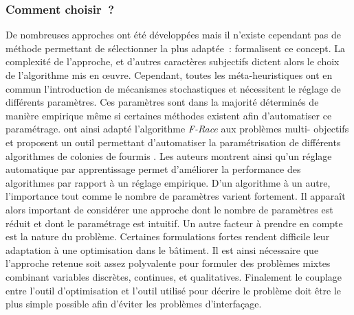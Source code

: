 \subsubsection{Comment choisir~?} %
\label{ssub:comment_choisir}
De nombreuses approches ont été développées mais il n’existe cependant pas de
méthode permettant de sélectionner la plus adaptée~: \textcite{Wolpert199767}
formalisent ce concept. La complexité de l’approche, et d’autres caractères
subjectifs dictent alors le choix de l’algorithme mis en œuvre. Cependant, toutes
les méta-heuristiques ont en commun l’introduction de mécanismes stochastiques
et nécessitent le réglage de différents paramètres. Ces paramètres sont dans la
majorité déterminés de manière empirique même si certaines méthodes
existent afin d’automatiser ce paramétrage. \textcite{Lopez-Ibanez2012861} ont ainsi
adapté l’algorithme \textit{F-Race} \parencite{Birattari2010311} aux problèmes multi-
objectifs et proposent un outil permettant d’automatiser la paramétrisation de
différents algorithmes de colonies de fourmis \parencite{Lopez-Ibanez2012861}.
Les auteurs montrent ainsi qu’un réglage automatique par apprentissage permet
d’améliorer la performance des algorithmes par rapport à un réglage empirique.
D’un algorithme à un autre, l’importance tout comme le nombre de paramètres
varient fortement. Il apparaît alors important de considérer une approche dont le
nombre de paramètres est réduit et dont le paramétrage est intuitif. Un autre
facteur à prendre en compte est la nature du problème. Certaines formulations
fortes rendent difficile leur adaptation à une optimisation dans le bâtiment. Il
est ainsi nécessaire que l’approche retenue soit assez polyvalente pour formuler des
problèmes mixtes combinant variables discrètes, continues, et qualitatives.
Finalement le couplage entre l’outil d’optimisation et l’outil utilisé pour
décrire le problème doit être le plus simple possible afin d’éviter les
problèmes d’interfaçage.

